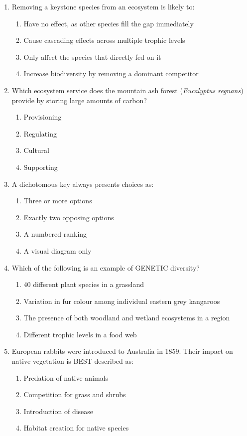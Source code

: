 \documentclass[11pt,a4paper]{article}
\begin{document}
\begin{enumerate}[label=\textbf{\arabic*.}, itemsep=10pt]
\item Removing a keystone species from an ecosystem is likely to:
\begin{enumerate}[label=\Alph*., itemsep=2pt]
  \item Have no effect, as other species fill the gap immediately
  \item Cause cascading effects across multiple trophic levels
  \item Only affect the species that directly fed on it
  \item Increase biodiversity by removing a dominant competitor
\end{enumerate}

\item Which ecosystem service does the mountain ash forest (\textit{Eucalyptus regnans}) provide by storing large amounts of carbon?
\begin{enumerate}[label=\Alph*., itemsep=2pt]
  \item Provisioning    \item Regulating    \item Cultural    \item Supporting
\end{enumerate}

\item A dichotomous key always presents choices as:
\begin{enumerate}[label=\Alph*., itemsep=2pt]
  \item Three or more options    \item Exactly two opposing options
  \item A numbered ranking       \item A visual diagram only
\end{enumerate}

\item Which of the following is an example of GENETIC diversity?
\begin{enumerate}[label=\Alph*., itemsep=2pt]
  \item 40 different plant species in a grassland
  \item Variation in fur colour among individual eastern grey kangaroos
  \item The presence of both woodland and wetland ecosystems in a region
  \item Different trophic levels in a food web
\end{enumerate}

\item European rabbits were introduced to Australia in 1859. Their impact on native vegetation is BEST described as:
\begin{enumerate}[label=\Alph*., itemsep=2pt]
  \item Predation of native animals    \item Competition for grass and shrubs
  \item Introduction of disease        \item Habitat creation for native species
\end{enumerate}


\end{enumerate}
\end{document}
